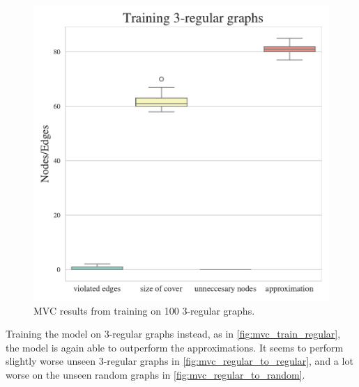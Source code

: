 \begin{figure}[h]
    \centering
    \includegraphics[width=\linewidth]{Project2TSP/_src/figures/mvc_train_regular.pdf}
    \caption{MVC results from training on 100 $3$-regular graphs.}
    \label{fig:mvc_train_regular}
\end{figure}

Training the model on $3$-regular graphs instead, as in \autoref{fig:mvc_train_regular}, the model is again able to outperform the approximations.
It seems to perform slightly worse unseen $3$-regular graphs in \autoref{fig:mvc_regular_to_regular}, and a lot worse on the unseen random graphs in \autoref{fig:mvc_regular_to_random}.


